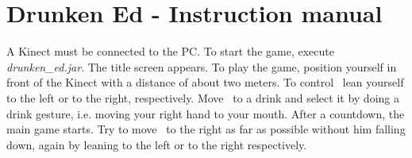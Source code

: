 \documentclass{article}
\begin{document}
\section{Drunken Ed - Instruction manual}

A Kinect must be connected to the PC. To start the game, execute \textit{drunken\_ed.jar}. The title screen appears. To play the game, position yourself in front of the Kinect with a distance of about two meters. To control \ed\ lean yourself to the left or to the right, respectively. Move \ed\ to a drink and select it by doing a drink gesture, i.e. moving your right hand to your mouth. After a countdown, the main game starts. Try to move \ed\ to the right as far as possible without him falling down, again by leaning to the left or to the right respectively. 
\end{document}
